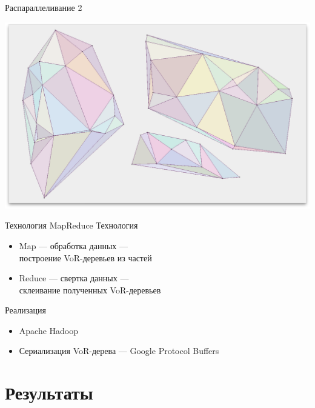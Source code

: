 \documentclass[14pt, fleqn, xcolor={dvipsnames, table}]{beamer}
\begin{document}
        \begin{frame}{Распараллеливание 2}
            \begin{center}
                \includegraphics[scale=0.295]{5.png}
            \end{center}            
        \end{frame}
        
        \begin{frame}{Технология MapReduce}
            Технология
            \begin{itemize}
                \item Map --- обработка данных --- \\ построение VoR-деревьев из частей 
                \item Reduce --- свертка данных --- \\ склеивание полученных VoR-деревьев
            \end{itemize} 
            Реализация
            \begin{itemize}
                \item Apache Hadoop
                \item Сериализация VoR-дерева --- Google Protocol Buffers
            \end{itemize}              
        \end{frame}
        
    \section{Результаты}
    
\end{document}
